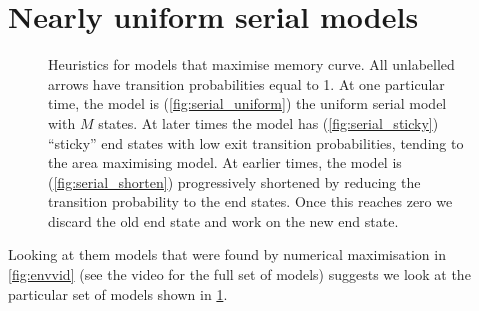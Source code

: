 \documentclass[12pt]{article}
\begin{document}

\section{Nearly uniform serial models}\label{sec:serial}

\begin{figure}[tb]
  \centering
  \begin{myenuma}
    \item{}\hspace{0.02\linewidth}\label{fig:serial_uniform}
    \item{}\hspace{0.02\linewidth}\label{fig:serial_sticky}
    \item{}\label{fig:serial_shorten}
  \end{myenuma}
  \caption[Heuristic optimal models]{Heuristics for models that maximise memory curve.
  All unlabelled arrows have transition probabilities equal to 1.
  At one particular time, the model is (\ref{fig:serial_uniform}) the uniform serial model with \(M\) states.
  At later times the model has (\ref{fig:serial_sticky}) ``sticky'' end states with low exit transition probabilities, tending to the area maximising model.
  At earlier times, the model is (\ref{fig:serial_shorten}) progressively shortened by reducing the transition probability to the end states.
  Once this reaches zero we discard the old end state and work on the new end state.
  } \label{fig:heuristicmodels}
\end{figure}


Looking at them models that were found by numerical maximisation in \cref{fig:envvid} (see the video for the full set of models) suggests we look at the particular set of models shown in \cref{fig:heuristicmodels}.
\end{document}
